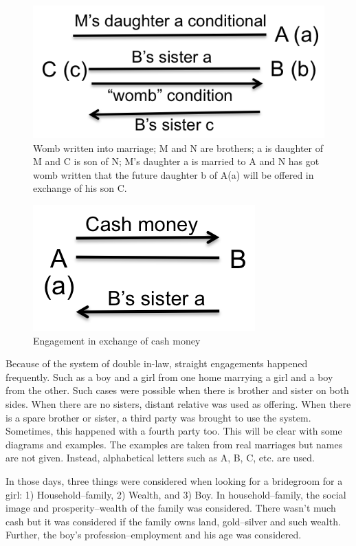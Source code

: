 \begin{figure}
\center
\includegraphics{figures/engagement/womb_7}
\caption{Womb written into marriage; M and N are brothers; a is daughter of M and C is son of N; M's daughter a is married to A and N has got womb written that the future daughter b of A(a) will be offered in exchange of his son C.
\label{figure:engage_7}}
\end{figure}

\begin{figure}
\center
\includegraphics{figures/engagement/cash_8}
\caption{Engagement in exchange of cash money
\label{figure:engage_8}}
\end{figure}

Because of the system of double in-law, straight engagements happened
frequently. Such as a boy and a girl from one home marrying a girl and a boy
from the other. Such cases were possible when there is brother and sister on
both sides. When there are no sisters, distant relative was used as offering.
When there is a spare brother or sister, a third party was brought to use the
system. Sometimes, this happened with a fourth party too. This will be clear
with some diagrams and examples. The examples are taken from real marriages but
names are not given. Instead, alphabetical letters such as A, B, C, etc. are used.

In those days, three things were considered when looking for a bridegroom for a
girl: 1) Household--family, 2) Wealth, and 3) Boy. In household--family, the
social image and prosperity--wealth of the family was considered. There wasn't
much cash but it was considered if the family owns land, gold--silver and such
wealth. Further, the boy's profession--employment and his age was considered.

